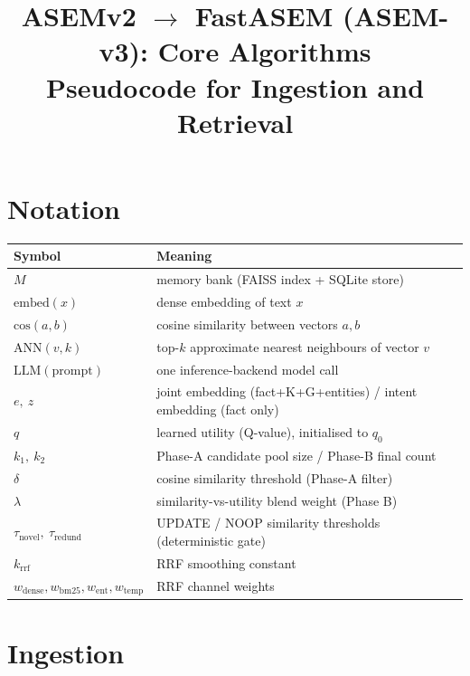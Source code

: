 \documentclass[11pt]{article}
\title{\textbf{ASEMv2 $\rightarrow$ FastASEM (ASEM-v3): Core Algorithms}\\
\large Pseudocode for Ingestion and Retrieval}
\author{}
\date{}
\newcommand{\ANN}{\mathrm{ANN}}
\newcommand{\cos}{\mathrm{cos}}
\newcommand{\embed}{\mathrm{embed}}
\newcommand{\LLM}{\mathrm{LLM}}
\newcommand{\tauR}{\tau_{\mathrm{redund}}}
\newcommand{\tauN}{\tau_{\mathrm{novel}}}
\newcommand{\rrfk}{k_{\mathrm{rrf}}}
\begin{document}
\maketitle

\section*{Notation}
\begin{center}
\renewcommand{\arraystretch}{1.25}
\begin{tabular}{ll}
\toprule
\textbf{Symbol} & \textbf{Meaning} \\
\midrule
$M$ & memory bank (FAISS index + SQLite store) \\
$\embed(x)$ & dense embedding of text $x$ \\
$\cos(a,b)$ & cosine similarity between vectors $a,b$ \\
$\ANN(v,k)$ & top-$k$ approximate nearest neighbours of vector $v$ \\
$\LLM(\text{prompt})$ & one inference-backend model call \\
$e,\ z$ & joint embedding (fact+K+G+entities) / intent embedding (fact only) \\
$q$ & learned utility (Q-value), initialised to $q_0$ \\
$k_1,\ k_2$ & Phase-A candidate pool size / Phase-B final count \\
$\delta$ & cosine similarity threshold (Phase-A filter) \\
$\lambda$ & similarity-vs-utility blend weight (Phase B) \\
$\tauN,\ \tauR$ & UPDATE / NOOP similarity thresholds (deterministic gate) \\
$\rrfk$ & RRF smoothing constant \\
$w_{\mathrm{dense}},w_{\mathrm{bm25}},w_{\mathrm{ent}},w_{\mathrm{temp}}$ & RRF channel weights \\
\bottomrule
\end{tabular}
\end{center}

\section*{Ingestion}
\end{document}
